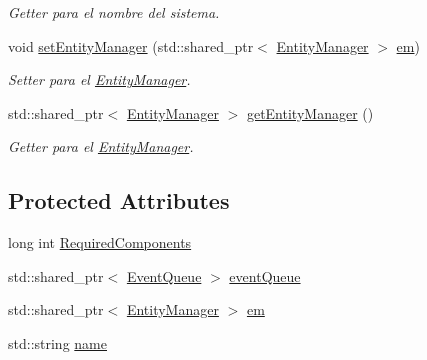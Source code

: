 \begin{DoxyCompactItemize}
\begin{DoxyCompactList}\small\item\em Getter para el nombre del sistema. \end{DoxyCompactList}\item 
void \hyperlink{classant_1_1_system_a1f983382d142ea697f1811f7f6f6ab17}{set\+Entity\+Manager} (std\+::shared\+\_\+ptr$<$ \hyperlink{classant_1_1_entity_manager}{Entity\+Manager} $>$ \hyperlink{classant_1_1_system_a5661d872ff769be150bd4e9a9552f6b9}{em})
\begin{DoxyCompactList}\small\item\em Setter para el \hyperlink{classant_1_1_entity_manager}{Entity\+Manager}. \end{DoxyCompactList}\item 
std\+::shared\+\_\+ptr$<$ \hyperlink{classant_1_1_entity_manager}{Entity\+Manager} $>$ \hyperlink{classant_1_1_system_adaad2087de7fc71924cfb5b134014b0a}{get\+Entity\+Manager} ()
\begin{DoxyCompactList}\small\item\em Getter para el \hyperlink{classant_1_1_entity_manager}{Entity\+Manager}. \end{DoxyCompactList}\end{DoxyCompactItemize}
\subsection*{Protected Attributes}
\begin{DoxyCompactItemize}
\item 
long int \hyperlink{classant_1_1_system_a4ef41cfc496e41ac6730f90629524ec7}{Required\+Components}
\item 
std\+::shared\+\_\+ptr$<$ \hyperlink{classant_1_1_event_queue}{Event\+Queue} $>$ \hyperlink{classant_1_1_system_a27e1814e13d161b5ef0e848e3da16d29}{event\+Queue}
\item 
std\+::shared\+\_\+ptr$<$ \hyperlink{classant_1_1_entity_manager}{Entity\+Manager} $>$ \hyperlink{classant_1_1_system_a5661d872ff769be150bd4e9a9552f6b9}{em}
\item 
std\+::string \hyperlink{classant_1_1_system_a60b3c00a760a3b4947ab1f1fc534a5b2}{name}
\end{DoxyCompactItemize}
